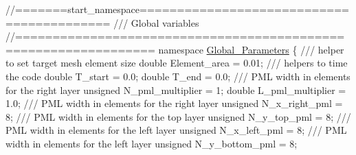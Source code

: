  
\begin{DoxyCodeInclude}
\textcolor{comment}{//=======start\_namespace==========================================}
\textcolor{comment}{/// Global variables}
\textcolor{comment}{}\textcolor{comment}{//================================================================}
\textcolor{keyword}{namespace }\hyperlink{namespaceGlobal__Parameters}{Global\_Parameters}
\{\textcolor{comment}{}
\textcolor{comment}{ /// helper to set target mesh element size}
\textcolor{comment}{} \textcolor{keywordtype}{double} Element\_area = 0.01; 
\textcolor{comment}{}
\textcolor{comment}{ /// helpers to time the code}
\textcolor{comment}{} \textcolor{keywordtype}{double} T\_start = 0.0;
 \textcolor{keywordtype}{double} T\_end = 0.0;
\textcolor{comment}{}
\textcolor{comment}{ /// PML width in elements for the right layer}
\textcolor{comment}{} \textcolor{keywordtype}{unsigned} N\_pml\_multiplier = 1;
 \textcolor{keywordtype}{double} L\_pml\_multiplier = 1.0;
\textcolor{comment}{}
\textcolor{comment}{ /// PML width in elements for the right layer}
\textcolor{comment}{} \textcolor{keywordtype}{unsigned} N\_x\_right\_pml = 8;
\textcolor{comment}{}
\textcolor{comment}{ /// PML width in elements for the top layer}
\textcolor{comment}{} \textcolor{keywordtype}{unsigned} N\_y\_top\_pml = 8;
\textcolor{comment}{}
\textcolor{comment}{ /// PML width in elements for the left layer}
\textcolor{comment}{} \textcolor{keywordtype}{unsigned} N\_x\_left\_pml = 8; 
\textcolor{comment}{}
\textcolor{comment}{ /// PML width in elements for the left layer}
\textcolor{comment}{} \textcolor{keywordtype}{unsigned} N\_y\_bottom\_pml = 8; 


\end{DoxyCodeInclude}
